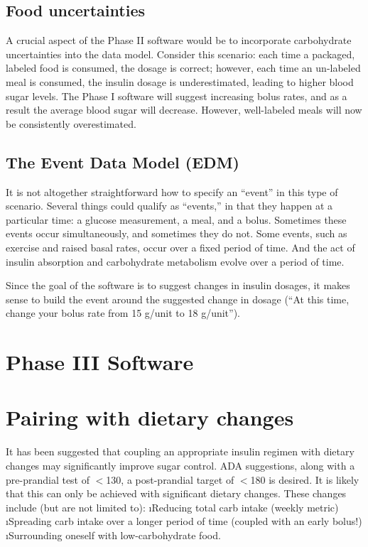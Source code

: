 \subsection{Food uncertainties}

A crucial aspect of the Phase II software would be to incorporate carbohydrate  uncertainties into the data model. Consider this scenario: each time a packaged, labeled food is consumed, the dosage is correct; however, each time an un-labeled meal is consumed, the insulin dosage is underestimated, leading to higher blood sugar levels. The Phase I software will suggest increasing bolus rates, and as a result the average blood sugar will decrease. However, well-labeled meals will now be consistently overestimated.

\subsection{The Event Data Model (EDM)}

It is not altogether straightforward how to specify an ``event'' in this type of scenario. Several things could qualify as ``events,'' in that they happen at a particular time: a glucose measurement, a meal, and a bolus. Sometimes these events occur simultaneously, and sometimes they do not. Some events, such as exercise and raised basal rates, occur over a fixed period of time. And the act of insulin absorption and carbohydrate metabolism evolve over a period of time.

Since the goal of the software is to suggest changes in insulin dosages, it makes sense to build the event around the suggested change in dosage (``At this time, change your bolus rate from 15 g/unit to 18 g/unit''). 

\section{Phase III Software}

\section{Pairing with dietary changes}
It has been suggested that coupling an appropriate insulin regimen with dietary changes may significantly improve sugar control. ADA suggestions, along with a pre-prandial test of $<$130, a post-prandial target of $<$180 is desired. It is likely that this can only be achieved with significant dietary changes. These changes include (but are not limited to):
\bi
	\i Reducing total carb intake (weekly metric)
	\i Spreading carb intake over a longer period of time (coupled with an early bolus!)
	\i Surrounding oneself with low-carbohydrate food.
\ei

